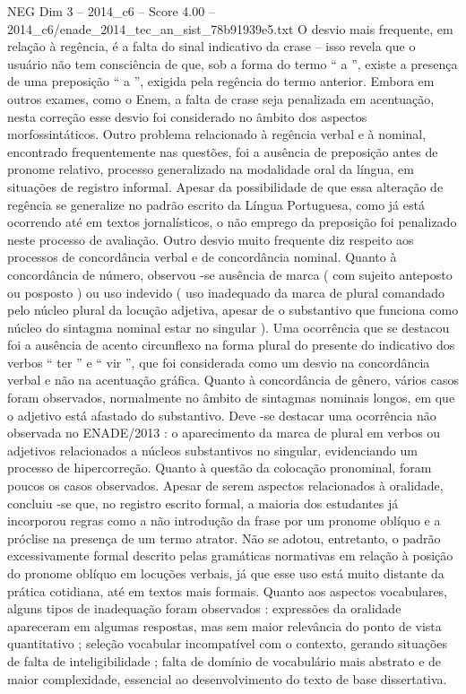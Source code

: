 \begin{textsample}{NEG Dim 3 – 2014\_c6 – Score 4.00 – 2014\_c6/enade\_2014\_tec\_an\_sist\_78b91939e5.txt}
O desvio mais frequente, em relação à regência, é a falta do sinal indicativo da crase – isso revela que o usuário não tem consciência de que, sob a forma do termo “ a ”, existe a presença de uma preposição “ a ”, exigida pela regência do termo anterior.
Embora em outros exames, como o Enem, a falta de crase seja penalizada em acentuação, nesta correção esse desvio foi considerado no âmbito dos aspectos morfossintáticos.
Outro problema relacionado à regência verbal e à nominal, encontrado frequentemente nas questões, foi a ausência de preposição antes de pronome relativo, processo generalizado na modalidade oral da língua, em situações de registro informal.
Apesar da possibilidade de que essa alteração de regência se generalize no padrão escrito da Língua Portuguesa, como já está ocorrendo até em textos jornalísticos, o não emprego da preposição foi penalizado neste processo de avaliação.
Outro desvio muito frequente diz respeito aos processos de concordância verbal e de concordância nominal.
Quanto à concordância de número, observou -se ausência de marca ( com sujeito anteposto ou posposto ) ou uso indevido ( uso inadequado da marca de plural comandado pelo núcleo plural da locução adjetiva, apesar de o substantivo que funciona como núcleo do sintagma nominal estar no singular ).
Uma ocorrência que se destacou foi a ausência de acento circunflexo na forma plural do presente do indicativo dos verbos “ ter ” e “ vir ”, que foi considerada como um desvio na concordância verbal e não na acentuação gráfica.
Quanto à concordância de gênero, vários casos foram observados, normalmente no âmbito de sintagmas nominais longos, em que o adjetivo está afastado do substantivo.
Deve -se destacar uma ocorrência não observada no ENADE/2013 : o aparecimento da marca de plural em verbos ou adjetivos relacionados a núcleos substantivos no singular, evidenciando um processo de hipercorreção.
Quanto à questão da colocação pronominal, foram poucos os casos observados.
Apesar de serem aspectos relacionados à oralidade, concluiu -se que, no registro escrito formal, a maioria dos estudantes já incorporou regras como a não introdução da frase por um pronome oblíquo e a próclise na presença de um termo atrator.
Não se adotou, entretanto, o padrão excessivamente formal descrito pelas gramáticas normativas em relação à posição do pronome oblíquo em locuções verbais, já que esse uso está muito distante da prática cotidiana, até em textos mais formais.
Quanto aos aspectos vocabulares, alguns tipos de inadequação foram observados : expressões da oralidade apareceram em algumas respostas, mas sem maior relevância do ponto de vista quantitativo ; seleção vocabular incompatível com o contexto, gerando situações de falta de inteligibilidade ; falta de domínio de vocabulário mais abstrato e de maior complexidade, essencial ao desenvolvimento do texto de base dissertativa.

\end{textsample}
